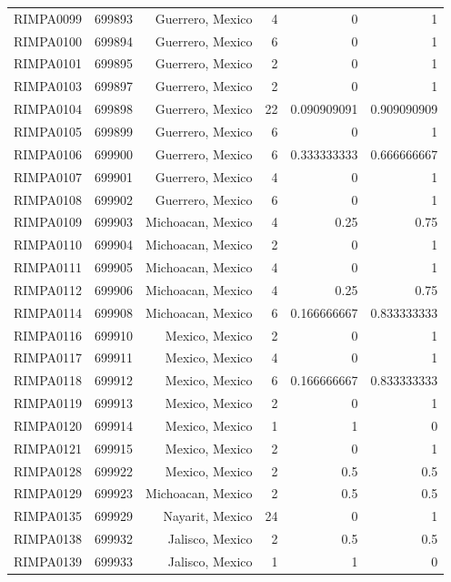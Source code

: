 \documentclass[12pt]{article}
\begin{document}
\begin{table}[htbp]
\begin{tabular}{rrrrrr}
    RIMPA0099 & 699893 & Guerrero, Mexico & 4     & 0     & 1 \\
    RIMPA0100 & 699894 & Guerrero, Mexico & 6     & 0     & 1 \\
    RIMPA0101 & 699895 & Guerrero, Mexico & 2     & 0     & 1 \\
    RIMPA0103 & 699897 & Guerrero, Mexico & 2     & 0     & 1 \\
    RIMPA0104 & 699898 & Guerrero, Mexico & 22    & 0.090909091 & 0.909090909 \\
    RIMPA0105 & 699899 & Guerrero, Mexico & 6     & 0     & 1 \\
    RIMPA0106 & 699900 & Guerrero, Mexico & 6     & 0.333333333 & 0.666666667 \\
    RIMPA0107 & 699901 & Guerrero, Mexico & 4     & 0     & 1 \\
    RIMPA0108 & 699902 & Guerrero, Mexico & 6     & 0     & 1 \\
    RIMPA0109 & 699903 & Michoacan, Mexico & 4     & 0.25  & 0.75 \\
    RIMPA0110 & 699904 & Michoacan, Mexico & 2     & 0     & 1 \\
    RIMPA0111 & 699905 & Michoacan, Mexico & 4     & 0     & 1 \\
    RIMPA0112 & 699906 & Michoacan, Mexico & 4     & 0.25  & 0.75 \\
    RIMPA0114 & 699908 & Michoacan, Mexico & 6     & 0.166666667 & 0.833333333 \\
    RIMPA0116 & 699910 & Mexico, Mexico & 2     & 0     & 1 \\
    RIMPA0117 & 699911 & Mexico, Mexico & 4     & 0     & 1 \\
    RIMPA0118 & 699912 & Mexico, Mexico & 6     & 0.166666667 & 0.833333333 \\
    RIMPA0119 & 699913 & Mexico, Mexico & 2     & 0     & 1 \\
    RIMPA0120 & 699914 & Mexico, Mexico & 1     & 1     & 0 \\
    RIMPA0121 & 699915 & Mexico, Mexico & 2     & 0     & 1 \\
    RIMPA0128 & 699922 & Mexico, Mexico & 2     & 0.5   & 0.5 \\
    RIMPA0129 & 699923 & Michoacan, Mexico & 2     & 0.5   & 0.5 \\
    RIMPA0135 & 699929 & Nayarit, Mexico & 24    & 0     & 1 \\
    RIMPA0138 & 699932 & Jalisco, Mexico & 2     & 0.5   & 0.5 \\
    RIMPA0139 & 699933 & Jalisco, Mexico & 1     & 1     & 0 \\

\end{tabular}
\end{table}
\end{document}
